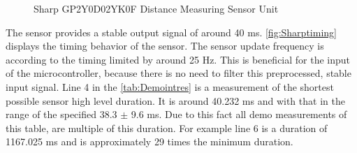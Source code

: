 \begin{figure}[H]
\begin{center}
			\hspace{0.8 cm}
		\caption[Sharp GP2Y0D02YK0F Distance Measuring Sensor Unit]{Sharp GP2Y0D02YK0F Distance Measuring Sensor Unit \cite{sharp}}
		\label{fig:sharp}
		\end{center}
\end{figure}

\newpage
The sensor provides a stable output signal of around 40 ms. \autoref{fig:Sharptiming} displays the timing behavior of the sensor. The sensor update frequency is according to the timing limited by around 25 Hz. This is beneficial for the input of the microcontroller, because there is no need to filter this preprocessed, stable input signal. Line 4 in the \autoref{tab:Demointres} is a measurement of the shortest possible sensor high level duration. It is around 40.232 ms and with that in the range of the specified 38.3 $\pm$ 9.6 ms. Due to this fact all demo measurements of this table, are multiple of this duration. For example line 6 is a duration of 1167.025 ms and is approximately 29 times the minimum duration.\\

